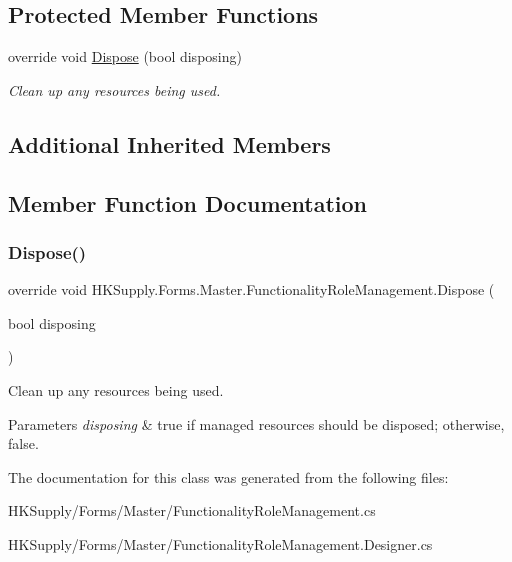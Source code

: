 \subsection*{Protected Member Functions}
\begin{DoxyCompactItemize}
\item 
override void \mbox{\hyperlink{class_h_k_supply_1_1_forms_1_1_master_1_1_functionality_role_management_a9a7c00e015e462fba8baf1e25be79413}{Dispose}} (bool disposing)
\begin{DoxyCompactList}\small\item\em Clean up any resources being used. \end{DoxyCompactList}\end{DoxyCompactItemize}
\subsection*{Additional Inherited Members}


\subsection{Member Function Documentation}
\mbox{\label{class_h_k_supply_1_1_forms_1_1_master_1_1_functionality_role_management_a9a7c00e015e462fba8baf1e25be79413}} 
\subsubsection{\texorpdfstring{Dispose()}{Dispose()}}
{\footnotesize\ttfamily override void H\+K\+Supply.\+Forms.\+Master.\+Functionality\+Role\+Management.\+Dispose (\begin{DoxyParamCaption}\item[{bool}]{disposing }\end{DoxyParamCaption})\hspace{0.3cm}{\ttfamily [protected]}}



Clean up any resources being used. 


\begin{DoxyParams}{Parameters}
{\em disposing} & true if managed resources should be disposed; otherwise, false.\\
\hline
\end{DoxyParams}


The documentation for this class was generated from the following files\+:\begin{DoxyCompactItemize}
\item 
H\+K\+Supply/\+Forms/\+Master/Functionality\+Role\+Management.\+cs\item 
H\+K\+Supply/\+Forms/\+Master/Functionality\+Role\+Management.\+Designer.\+cs\end{DoxyCompactItemize}
